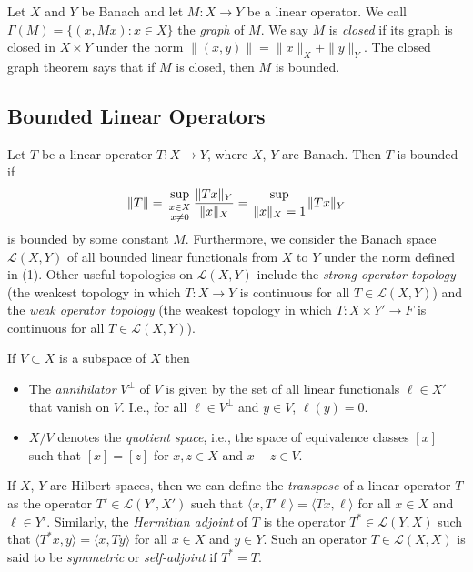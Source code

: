 \documentclass[12pt]{article}
\begin{document}
Let $X$ and $Y$ be Banach and let $M : X \rightarrow Y$ be a linear
operator. We call $\Gamma(M) = \{(x, Mx) : x\in X\}$ the {\it graph}
of $M$. We say $M$ is {\it closed} if its graph is closed in
$X\times Y$ under the norm $\|(x,y)\| = \|x\|_X + \|y\|_Y$.
The closed graph theorem says that if $M$ is closed, then $M$ is
bounded.

\subsection*{Bounded Linear Operators}

Let $T$ be a linear operator $T : X \rightarrow Y$, where $X$, $Y$
are Banach.
Then $T$ is bounded if 
\begin{equation}
	\|T\| = {\sup\atop {x\in X \atop x\neq 0}}
	\frac{\|Tx\|_Y}{\|x\|_X}
	= {\sup \atop \|x\|_X = 1} \|Tx\|_Y 
\end{equation}
is bounded by some constant $M$. Furthermore, we consider the Banach space
$\mathcal{L}(X,Y)$ of all bounded linear functionals from $X$ to $Y$ under
the norm defined in (1). Other useful topologies on $\mathcal{L}(X,Y)$
include the {\it strong operator topology} (the weakest topology in which 
$T : X \rightarrow Y$ is continuous for all $T\in\mathcal{L}(X,Y)$) and
the {\it weak operator topology} (the weakest topology in which 
$T : X \times Y' \rightarrow F$ is continuous for all 
$T\in\mathcal{L}(X,Y)$).

If $V \subset X$ is a subspace of $X$ then
\begin{itemize}
	\item The {\it annihilator} $V^\perp$ of $V$ is given by the set
		of all linear functionals $\ell \in X'$ that vanish on
		$V$. I.e., for all $\ell \in V^\perp$ and $y \in V$,
		$\ell(y) = 0$.
	\item $X / V$ denotes the {\it quotient space}, i.e., the space of
		equivalence classes $[x]$ such that $[x] = [z]$ for
		$x,z\in X$ and $x-z \in V$.
\end{itemize}

If $X$, $Y$ are Hilbert spaces, then we can define the {\it transpose} of
a linear operator $T$ as the operator $T' \in \mathcal{L}(Y',X')$ such that
$\langle x, T'\ell\rangle = \langle Tx, \ell \rangle$ for all $x\in X$ and
$\ell\in Y'$. Similarly, the {\it Hermitian adjoint} of $T$ is the operator
$T^* \in \mathcal{L}(Y,X)$ such that 
$\langle T^* x, y\rangle = \langle x, Ty \rangle$ for all $x\in X$ and
$y\in Y$. Such an operator $T\in\mathcal{L}(X,X)$ is said to be {\it symmetric}
or {\it self-adjoint} if $T^* = T$. 
\end{document}
